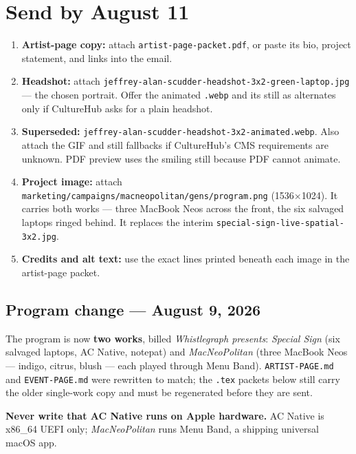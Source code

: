 \documentclass[11pt,letterpaper]{article}
\begin{document}

\section{Send by August 11}
\par
\begin{enumerate}
\item \textbf{Artist-page copy:} attach \texttt{artist-page-packet.pdf}, or paste its bio, project statement, and links into the email.
\item \textbf{Headshot:} attach \texttt{jeffrey-alan-scudder-headshot-3x2-green-laptop.jpg} --- the chosen portrait. Offer the animated \texttt{.webp} and its still as alternates only if CultureHub asks for a plain headshot.
\item \textbf{Superseded:} \texttt{jeffrey-alan-scudder-headshot-3x2-animated.webp}. Also attach the GIF and still fallbacks if CultureHub’s CMS requirements are unknown. PDF preview uses the smiling still because PDF cannot animate.
\item \textbf{Project image:} attach \texttt{marketing/campaigns/macneopolitan/gens/program.png} (1536×1024). It carries both works --- three MacBook Neos across the front, the six salvaged laptops ringed behind. It replaces the interim \texttt{special-sign-live-spatial-3x2.jpg}.
\item \textbf{Credits and alt text:} use the exact lines printed beneath each image in the artist-page packet.
\end{enumerate}

\subsection{Program change --- August 9, 2026}
The program is now \textbf{two works}, billed \emph{Whistlegraph presents}: \emph{Special Sign} (six salvaged laptops, AC Native, notepat) and \emph{MacNeoPolitan} (three MacBook Neos --- indigo, citrus, blush --- each played through Menu Band). \texttt{ARTIST-PAGE.md} and \texttt{EVENT-PAGE.md} were rewritten to match; the \texttt{.tex} packets below still carry the older single-work copy and must be regenerated before they are sent.

\textbf{Never write that AC Native runs on Apple hardware.} AC Native is x86\_64 UEFI only; \emph{MacNeoPolitan} runs Menu Band, a shipping universal macOS app.
\end{document}
